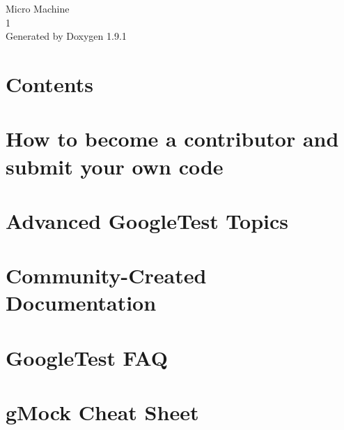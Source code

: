 \let\mypdfximage\pdfximage\def\pdfximage{\immediate\mypdfximage}\documentclass[twoside]{book}
\newcommand{\+}{\discretionary{\mbox{\scriptsize$\hookleftarrow$}}{}{}}
\newcommand{\clearemptydoublepage}{%
  \newpage{\pagestyle{empty}\cleardoublepage}%
}
\begin{document}
\raggedbottom

\hypersetup{pageanchor=false,
             bookmarksnumbered=true,
             pdfencoding=unicode
            }
\begin{titlepage}
\vspace*{7cm}
\begin{center}%
{\Large Micro Machine \\[1ex]\large 1 }\\
\vspace*{1cm}
{\large Generated by Doxygen 1.9.1}\\
\end{center}
\end{titlepage}
\clearemptydoublepage
{}
\tableofcontents
\clearemptydoublepage
{}
\hypersetup{pageanchor=true}

\chapter{Contents}
\label{md_doc_readme}

\chapter{How to become a contributor and submit your own code}
\label{md_googletest_CONTRIBUTING}

\chapter{Advanced Google\+Test Topics}
\label{md_googletest_docs_advanced}

\chapter{Community-\/\+Created Documentation}
\label{md_googletest_docs_community_created_documentation}

\chapter{Google\+Test FAQ}
\label{md_googletest_docs_faq}

\chapter{g\+Mock Cheat Sheet}
\label{md_googletest_docs_gmock_cheat_sheet}

\end{document}
